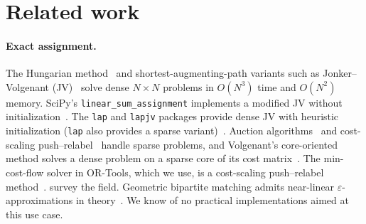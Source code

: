 \section{Related work}
\label{sec:related}

\paragraph{Exact assignment.} The Hungarian method~\citep{kuhn1955hungarian,munkres1957algorithms}
and shortest-augmenting-path variants such as Jonker--Volgenant
(JV)~\citep{jonker1987shortest} solve dense $N\times N$ problems in $O(N^3)$ time and
$O(N^2)$ memory. SciPy's \texttt{linear\_sum\_assignment} implements a modified JV
without initialization~\citep{crouse2016implementing,virtanen2020scipy}. The
\texttt{lap} and \texttt{lapjv} packages provide dense JV with heuristic initialization
(\texttt{lap} also provides a sparse variant)~\citep{kazmar_lap,markovtsev_lapjv}.
Auction algorithms~\citep{bertsekas1979distributed,bertsekas1988auction} and cost-scaling
push--relabel~\citep{goldberg1995efficient} handle sparse problems, and Volgenant's core-oriented
method solves a dense problem on a sparse core of its cost matrix~\citep{volgenant1996linear}. The min-cost-flow
solver in OR-Tools, which we use, is a cost-scaling push--relabel
method~\citep{ortools,ortools_mincostflow_doc}. \citet{burkard2009assignment} survey the
field. Geometric bipartite matching admits near-linear $\varepsilon$-approximations in
theory~\citep{sharathkumar2012transportation,raghvendra2020nearlinear}. We know of no
practical implementations aimed at this use case.

